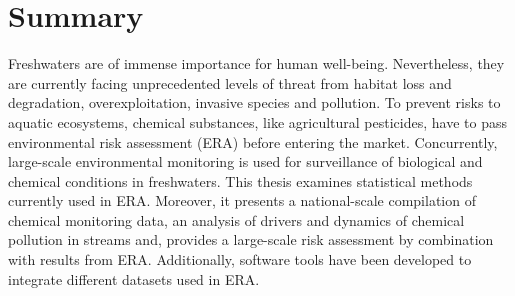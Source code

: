 



\thispagestyle{empty}
\begingroup
\let\clearpage\relax
\let\cleardoublepage\relax
\let\cleardoublepage\relax
\chapter*{Summary}
\thispagestyle{empty}

Freshwaters are of immense importance for human well-being.
Nevertheless, they are currently facing unprecedented levels of threat from habitat loss and degradation, overexploitation, invasive species and
pollution. 
To prevent risks to aquatic ecosystems, chemical substances, like agricultural pesticides, have to pass environmental risk assessment (ERA) before entering the market. 
Concurrently, large-scale environmental monitoring is used for surveillance of biological and chemical conditions in freshwaters. 
This thesis examines statistical methods currently used in ERA.
Moreover, it presents a national-scale compilation of chemical monitoring data, an analysis of drivers and dynamics of chemical pollution in streams and, provides a large-scale risk assessment by combination with results from ERA.
Additionally, software tools have been developed to integrate different datasets used in ERA.

